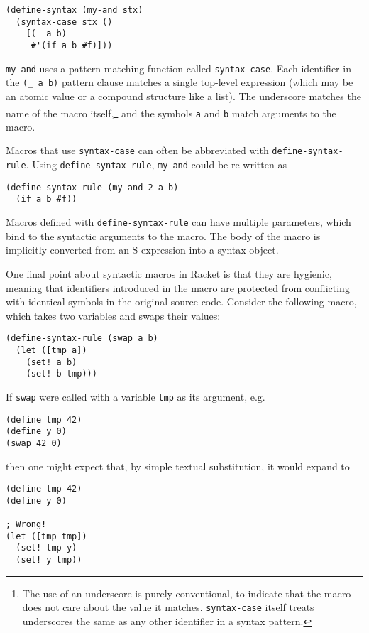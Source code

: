 \documentclass{article}
\begin{document}
\begin{lstlisting}
(define-syntax (my-and stx)
  (syntax-case stx ()
    [(_ a b)
     #'(if a b #f)]))
\end{lstlisting}

\texttt{my-and} uses a pattern-matching function called \texttt{syntax-case}. Each identifier in the \texttt{(\_ a b)} pattern clause matches a single top-level expression (which may be an atomic value or a compound structure like a list). The underscore matches the name of the macro itself,\footnote{The use of an underscore is purely conventional, to indicate that the macro does not care about the value it matches. \texttt{syntax-case} itself treats underscores the same as any other identifier in a syntax pattern.} and the symbols \texttt{a} and \texttt{b} match arguments to the macro.

Macros that use \texttt{syntax-case} can often be abbreviated with \texttt{define-syntax-rule}. Using \texttt{define-syntax-rule}, \texttt{my-and} could be re-written as

\begin{lstlisting}
(define-syntax-rule (my-and-2 a b)
  (if a b #f))
\end{lstlisting}

Macros defined with \texttt{define-syntax-rule} can have multiple parameters, which bind to the syntactic arguments to the macro. The body of the macro is implicitly converted from an S-expression into a syntax object.

One final point about syntactic macros in Racket is that they are hygienic, meaning that identifiers introduced in the macro are protected from conflicting with identical symbols in the original source code. Consider the following macro, which takes two variables and swaps their values:

\begin{lstlisting}
(define-syntax-rule (swap a b)
  (let ([tmp a])
    (set! a b)
    (set! b tmp)))
\end{lstlisting}

If \texttt{swap} were called with a variable \texttt{tmp} as its argument, e.g.

\begin{lstlisting}
(define tmp 42)
(define y 0)
(swap 42 0)
\end{lstlisting}

\noindent then one might expect that, by simple textual substitution, it would expand to

\begin{lstlisting}
(define tmp 42)
(define y 0)

; Wrong!
(let ([tmp tmp])
  (set! tmp y)
  (set! y tmp))
\end{lstlisting}
\end{document}
